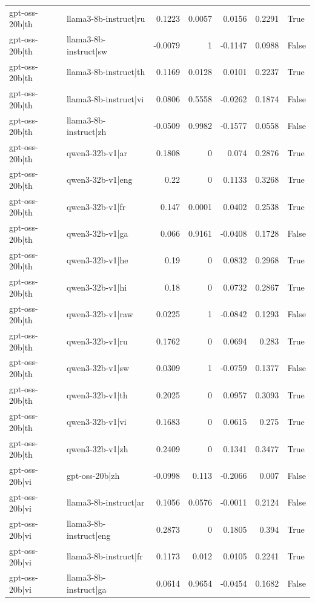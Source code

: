 \begin{table}
\begin{tabular}{l l r r r r l}
gpt-oss-20b|th & llama3-8b-instruct|ru & 0.1223 & 0.0057 & 0.0156 & 0.2291 & True \\
gpt-oss-20b|th & llama3-8b-instruct|sw & -0.0079 & 1 & -0.1147 & 0.0988 & False \\
gpt-oss-20b|th & llama3-8b-instruct|th & 0.1169 & 0.0128 & 0.0101 & 0.2237 & True \\
gpt-oss-20b|th & llama3-8b-instruct|vi & 0.0806 & 0.5558 & -0.0262 & 0.1874 & False \\
gpt-oss-20b|th & llama3-8b-instruct|zh & -0.0509 & 0.9982 & -0.1577 & 0.0558 & False \\
gpt-oss-20b|th & qwen3-32b-v1|ar & 0.1808 & 0 & 0.074 & 0.2876 & True \\
gpt-oss-20b|th & qwen3-32b-v1|eng & 0.22 & 0 & 0.1133 & 0.3268 & True \\
gpt-oss-20b|th & qwen3-32b-v1|fr & 0.147 & 0.0001 & 0.0402 & 0.2538 & True \\
gpt-oss-20b|th & qwen3-32b-v1|ga & 0.066 & 0.9161 & -0.0408 & 0.1728 & False \\
gpt-oss-20b|th & qwen3-32b-v1|he & 0.19 & 0 & 0.0832 & 0.2968 & True \\
gpt-oss-20b|th & qwen3-32b-v1|hi & 0.18 & 0 & 0.0732 & 0.2867 & True \\
gpt-oss-20b|th & qwen3-32b-v1|raw & 0.0225 & 1 & -0.0842 & 0.1293 & False \\
gpt-oss-20b|th & qwen3-32b-v1|ru & 0.1762 & 0 & 0.0694 & 0.283 & True \\
gpt-oss-20b|th & qwen3-32b-v1|sw & 0.0309 & 1 & -0.0759 & 0.1377 & False \\
gpt-oss-20b|th & qwen3-32b-v1|th & 0.2025 & 0 & 0.0957 & 0.3093 & True \\
gpt-oss-20b|th & qwen3-32b-v1|vi & 0.1683 & 0 & 0.0615 & 0.275 & True \\
gpt-oss-20b|th & qwen3-32b-v1|zh & 0.2409 & 0 & 0.1341 & 0.3477 & True \\
gpt-oss-20b|vi & gpt-oss-20b|zh & -0.0998 & 0.113 & -0.2066 & 0.007 & False \\
gpt-oss-20b|vi & llama3-8b-instruct|ar & 0.1056 & 0.0576 & -0.0011 & 0.2124 & False \\
gpt-oss-20b|vi & llama3-8b-instruct|eng & 0.2873 & 0 & 0.1805 & 0.394 & True \\
gpt-oss-20b|vi & llama3-8b-instruct|fr & 0.1173 & 0.012 & 0.0105 & 0.2241 & True \\
gpt-oss-20b|vi & llama3-8b-instruct|ga & 0.0614 & 0.9654 & -0.0454 & 0.1682 & False \\

\end{tabular}
\end{table}
